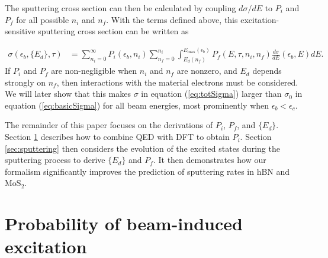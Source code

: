 \documentclass{article}
\begin{document}
\noindent
The sputtering cross section can then be calculated by coupling $d\sigma/dE$ to
$P_i$ and $P_f$ for all possible $n_i$ and $n_f$.
With the terms defined above, this excitation-sensitive sputtering cross
section can be written as

\begin{equation}
  \begin{aligned}
    \sigma(\epsilon_b, \{{E}_d\}, \tau)
    &=
    \sum_{n_i=0}^\infty
    P_i(\epsilon_b, n_i)
    \sum_{n_f=0}^{n_i}
    \int_{E_d(n_f)}^{E_\text{max}(\epsilon_b)}
    P_f(E, \tau, n_i, n_f)
    \frac{d\sigma}{dE}(\epsilon_b, E)
    dE.
  \end{aligned}
  \label{eq:totSigma}
\end{equation}
%
If $P_i$ and $P_f$ are non-negligible when $n_i$ and $n_f$ are nonzero, and
$E_d$ depends strongly on $n_f$, then interactions with the material electrons
must be considered.
We will later show that this makes $\sigma$ in equation (\ref{eq:totSigma})
larger than $\sigma_0$ in equation (\ref{eq:basicSigma}) for all beam energies,
most prominently when $\epsilon_b < \epsilon_c$.

The remainder of this paper focuses on the derivations of $P_i$, $P_f$, and
$\{E_d\}$.
Section \ref{sec:probability} describes how to combine QED with DFT to obtain
$P_i$.
Section \ref{sec:sputtering} then considers the evolution of the excited states
during the sputtering process to derive $\{E_d\}$ and $P_f$. It then demonstrates
how our formalism significantly improves the prediction of sputtering rates in
hBN and MoS$_2$.

\section{Probability of beam-induced excitation} 
\label{sec:probability}
\end{document}
